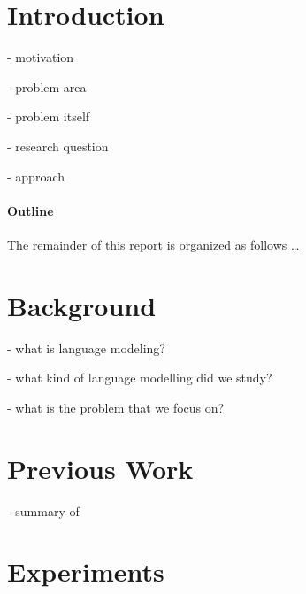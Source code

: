 \documentclass[twoside]{article}
\begin{document}
\begin{multicols}{2} %

\section{Introduction}
- motivation

- problem area

- problem itself

- research question

- approach

\paragraph{Outline}
The remainder of this report is organized as follows \ldots



\section{Background}
\label{background}

- what is language modeling?

- what kind of language modelling did we study?

- what is the problem that we focus on?




\section{Previous Work}
\label{previous work}

- summary of ~\cite{Linzen2016}




\section{Experiments}
\label{experiments}


\end{multicols}
\end{document}
